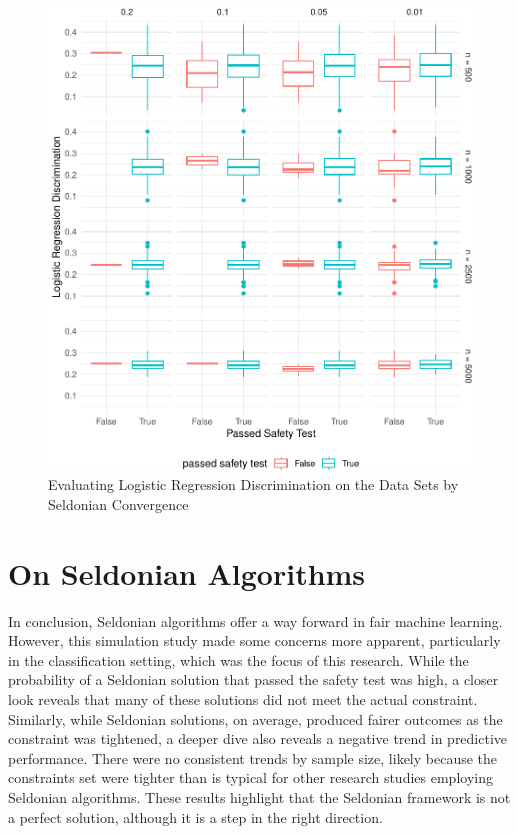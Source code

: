 \documentclass[12pt, twoside]{amherstthesis}
\begin{document}
\begin{figure}

{\centering \includegraphics{Dasha-Asienga_StatThesis_files/figure-latex/ch4fig6-1} 

}

\caption{Evaluating Logistic Regression Discrimination on the Data Sets by Seldonian Convergence}\label{fig:ch4fig6}
\end{figure}
\newpage

\hypertarget{on-seldonian-algorithms}{%
\section{On Seldonian Algorithms}\label{on-seldonian-algorithms}}

In conclusion, Seldonian algorithms offer a way forward in fair machine learning. However, this simulation study made some concerns more apparent, particularly in the classification setting, which was the focus of this research. While the probability of a Seldonian solution that passed the safety test was high, a closer look reveals that many of these solutions did not meet the actual constraint. Similarly, while Seldonian solutions, on average, produced fairer outcomes as the constraint was tightened, a deeper dive also reveals a negative trend in predictive performance. There were no consistent trends by sample size, likely because the constraints set were tighter than is typical for other research studies employing Seldonian algorithms. These results highlight that the Seldonian framework is not a perfect solution, although it is a step in the right direction.
\end{document}
